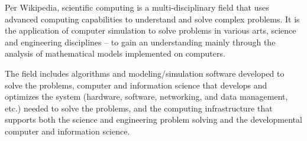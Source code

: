 \documentclass[letterpaper,12pt]{article}
\begin{document}
Per Wikipedia, scientific computing is a multi-disciplinary field that 
uses advanced computing capabilities to understand and solve complex 
problems. It is the application of computer simulation to solve problems
in various arts, science and engineering disciplines -- to gain an 
understanding mainly through the analysis of mathematical models 
implemented on computers.

The field includes algorithms and modeling/simulation software developed
to solve the problems, computer and information science that develops and
optimizes the system (hardware, software, networking, and data management,
etc.) needed to solve the problems, and the computing infrastructure that
supports both the science and engineering problem solving and the 
developmental computer and information science.

\end{document}
